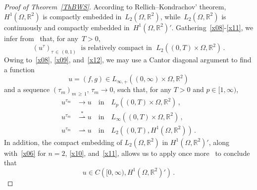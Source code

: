 \documentclass[10pt]{amsart}
\theoremstyle{definition}\newtheorem{defi}[theo]{Definition}\newtheorem{rema}[theo]{Remark}\newtheorem{exam}[theo]{Example}\newtheorem{exem}[theo]{Example}\newtheorem{nota}[theo]{Notation}
\newcommand{\bbR}{\mathbb{R}}
\begin{document}
\begin{proof}[Proof of Theorem~\ref{ThBWS}]
According to Rellich--Kondrachov' theorem, $H^1(\Omega,\bbR^2)$ is compactly embedded in~${L_2(\Omega,\bbR^2)}$, while~${L_2(\Omega,\bbR^2)}$ is continuously and compactly embedded in~$H^1(\Omega,\bbR^2)'$. Gathering~\eqref{x08}-\eqref{x11}, we infer from~\cite[Theorem~1]{DJ2012} that, for any~${T>0}$,
\begin{equation}\label{x12}
(u^\tau)_{\tau\,\in\,(0,1)} \;\text{ is relatively compact in }\; L_2\left((0,T)\times\Omega,\bbR^2\right)\,. 
\end{equation}
Owing to~\eqref{x08}, \eqref{x09}, and~\eqref{x12}, we may use a Cantor diagonal argument to find a function
\begin{equation*}
u=(f,g)\in L_{\infty,+}\left((0,\infty)\times\Omega,\bbR^2\right)
\end{equation*}
and a sequence $(\tau_m)_{m\,\ge\,1}$, $\tau_m\to 0$, such that, for any $T>0$ and $p\in [1,\infty)$,
\begin{equation}\label{x13}
\begin{split}
u^{\tau_m} & \rightarrow u \quad\text{in}\quad L_p\left((0,T)\times\Omega,\bbR^2\right)\,, \\
u^{\tau_m} & \stackrel{*}{\rightharpoonup} u \quad\text{in}\quad L_\infty\left((0,T)\times\Omega,\bbR^2\right)\,, \\
u^{\tau_m} & \rightharpoonup u \quad\text{in}\quad L_2\left((0,T),H^1\left(\Omega,\bbR^2\right)\right)\,.
\end{split}
\end{equation}
In addition, the compact embedding of $L_2(\Omega,\bbR^2)$ in $H^1(\Omega,\bbR^2)'$, along with~\eqref{x06} for $n=2$, \eqref{x10}, and~\eqref{x11}, allows us to apply once more~\cite[Theorem~1]{DJ2012} to conclude that
\begin{equation}\label{x14}
u\in C\left([0,\infty),H^1\left(\Omega,\bbR^2\right)'\right)\,. 
\end{equation}


\end{proof}
\end{document}
